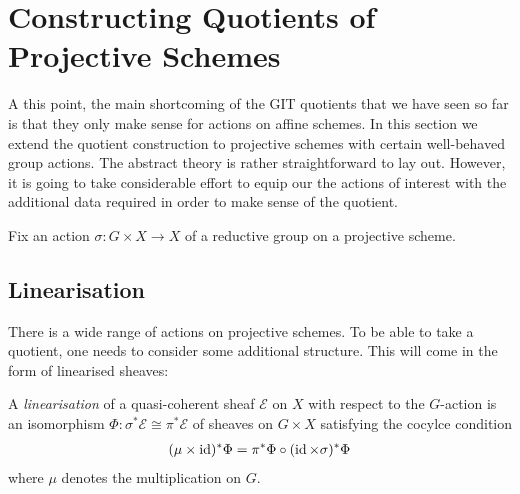 \documentclass[12pt]{ociamthesis}  %
\begin{document}
\missingsection

\section{Constructing Quotients of Projective Schemes}

A this point, the main shortcoming of the GIT quotients that
we have seen so far is that they only make sense for actions on
affine schemes. In this section we extend the quotient construction
to projective schemes with certain well-behaved group actions.
The abstract theory is rather straightforward to lay out. However,
it is going to take considerable effort to equip our the actions of interest
with the additional data required in order to make sense of the quotient.

Fix an action $\sigma : G\times X\to X$ of a reductive
group on a projective scheme.

\subsection{Linearisation}

There is a wide range of actions on projective schemes. To be able to
take a quotient, one needs to consider some additional structure. This
will come in the form of linearised sheaves:

\begin{definition}
  A \emph{linearisation} of a quasi-coherent sheaf
  $\mathscr E$ on $X$ with respect to the $G$-action
  is an isomorphism $\Phi : \sigma^*\mathscr E \cong\pi^*\mathscr E$
  of sheaves on $G\times X$ satisfying the cocylce condition
  \begin{align}\label{eq:cocyle_condition}
    (\mu \times \operatorname{id})^*\Phi = \pi^*\Phi \circ (\operatorname{id}\times\sigma)^*\Phi
  \end{align}
  where $\mu$ denotes the multiplication on $G$.
\end{definition}
\end{document}
